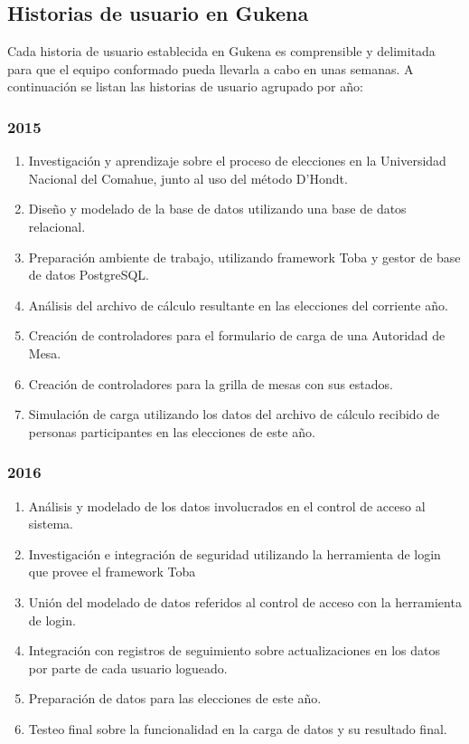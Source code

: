 \subsection{Historias de usuario en Gukena}
 Cada historia de usuario establecida en Gukena es comprensible y delimitada para que el equipo conformado pueda llevarla a cabo en unas semanas. A continuación se listan las historias de usuario agrupado por año:\newline
\subsubsection{2015}
\begin{enumerate}
    \item Investigación y aprendizaje sobre el proceso de elecciones en la Universidad Nacional del Comahue, junto al uso del método D'Hondt.
    \item Diseño y modelado de la base de datos utilizando una base de datos relacional.
    \item Preparación ambiente de trabajo, utilizando framework Toba y gestor de base de datos PostgreSQL.
    \item Análisis del archivo de cálculo resultante en las elecciones del corriente año.
    \item Creación de controladores para el formulario de carga de una Autoridad de Mesa.
    \item Creación de controladores para la grilla de mesas con sus estados.
    \item Simulación de carga utilizando los datos del archivo de cálculo recibido de personas participantes en las elecciones de este año.
\end{enumerate}
\subsubsection{2016}
\begin{enumerate}
    \item Análisis y modelado de los datos involucrados en el control de acceso al sistema.
    \item Investigación e integración de seguridad utilizando la herramienta de login que provee el framework Toba
    \item Unión del modelado de datos referidos al control de acceso con la herramienta de login.
    \item Integración con registros de seguimiento sobre actualizaciones en los datos por parte de cada usuario logueado.
    \item Preparación de datos para las elecciones de este año.
    \item Testeo final sobre la funcionalidad en la carga de datos y su resultado final.
\end{enumerate}

